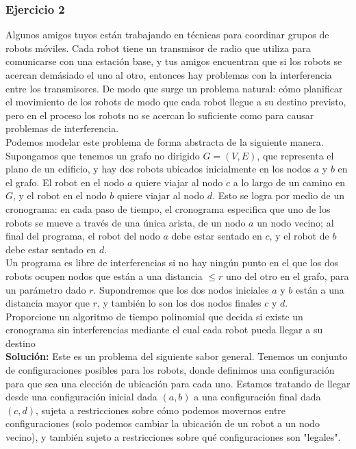 \documentclass[a4paper, 12pt]{book}
\begin{document}
\subsubsection*{Ejercicio 2}

Algunos amigos tuyos están trabajando en técnicas para coordinar grupos de robots móviles. Cada robot tiene un transmisor de radio que utiliza para comunicarse con una estación base, y tus amigos encuentran que si los robots se acercan demásiado el uno al otro, entonces hay problemas con la interferencia entre los transmisores. De modo que surge un problema natural: cómo planificar el movimiento de los robots de modo que cada robot llegue a su destino previsto, pero en el proceso los robots no se acercan lo suficiente como para causar problemas de interferencia.\\

Podemos modelar este problema de forma abstracta de la siguiente manera. Supongamos que tenemos un grafo no dirigido $G =(V, E)$, que representa el plano de un edificio, y hay dos robots ubicados inicialmente en los nodos $a$ y $b$ en el grafo. El robot en el nodo $a$ quiere viajar al nodo $c$ a lo largo de un camino en $G$, y el robot en el nodo $b$ quiere viajar al nodo $d$. Esto se logra por medio de un cronograma: en cada paso de tiempo, el cronograma especifica que uno de los robots se mueve a través de una única arista, de un nodo $a$ un nodo vecino; al final del programa, el robot del nodo $a$ debe estar sentado en $c$, y el robot de $b$ debe estar sentado en $d$.\\

Un programa es libre de interferencias si no hay ningún punto en el que los dos robots ocupen nodos que están a una distancia $≤ r$ uno del otro en el grafo, para un parámetro dado $r$. Supondremos que los dos nodos iniciales $a$ y $b$ están a una distancia mayor que $r$, y también lo son los dos nodos finales $c$ y $d$.\\

Proporcione un algoritmo de tiempo polinomial que decida si existe un cronograma sin interferencias mediante el cual cada robot pueda llegar a su destino\\

\textbf{Solución:} Este es un problema del siguiente sabor general. Tenemos un conjunto de configuraciones posibles para los robots, donde definimos una configuración para que sea una elección de ubicación para cada uno. Estamos tratando de llegar desde una configuración inicial dada $(a,b)$ a una configuración final dada $(c,d)$, sujeta a restricciones sobre cómo podemos movernos entre configuraciones (solo podemos cambiar la ubicación de un robot a un nodo vecino), y también sujeto a restricciones sobre qué configuraciones son "legales".\\
\end{document}
